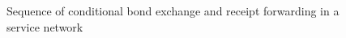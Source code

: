 \begin{figure}
\begin{tikzpicture}[every node/.style={font=\normalsize,
  minimum height=.75cm,minimum width=1cm},]
\end{tikzpicture}
\caption{Sequence of conditional bond exchange and receipt forwarding in a service network}
\label{fig:svcnets-sequence-diagram}
\end{figure}